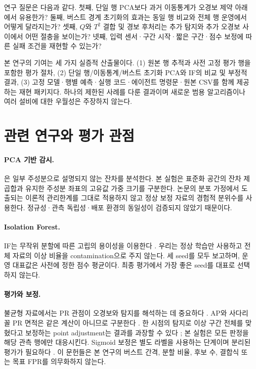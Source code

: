 \documentclass{article}
\begin{document}
연구 질문은 다음과 같다. 첫째, 단일 행 PCA보다 과거 이동통계가 오경보 제약 아래에서 유용한가? 둘째, 버스트 경계 초기화의 효과는 동일 행 비교와 전체 행 운영에서 어떻게 달라지는가? 셋째, $Q$와 $T^2$ 결합 및 경보 후처리는 추가 탐지와 추가 오경보 사이에서 어떤 절충을 보이는가? 넷째, 입력 센서·구간 시작·짧은 구간·점수 보정에 따른 실패 조건을 재현할 수 있는가?

본 연구의 기여는 세 가지 실증적 산출물이다. (1) 원본 행 추적과 사전 고정 평가 행을 포함한 평가 절차, (2) 단일 행/이동통계/버스트 초기화 PCA와 IF의 비교 및 부정적 결과, (3) 고정 모델·행별 예측·실행 코드·에이전트 명령문·원본 CSV를 함께 제공하는 재현 패키지다. 하나의 제한된 사례를 다룬 결과이며 새로운 범용 알고리즘이나 여러 설비에 대한 우월성은 주장하지 않는다.

\section{관련 연구와 평가 관점}
\paragraph{PCA 기반 감시.}
\citet{jackson1979}은 일부 주성분으로 설명되지 않는 잔차를 분석한다. 본 실험은 표준화 공간의 잔차 제곱합과 유지한 주성분 좌표의 고유값 가중 크기를 구분한다. 논문의 분포 가정에서 도출되는 이론적 관리한계를 그대로 적용하지 않고 정상 보정 자료의 경험적 분위수를 사용한다. 정규성·관측 독립성·배포 환경의 동일성이 검증되지 않았기 때문이다.

\paragraph{Isolation Forest.}
IF는 무작위 분할에 따른 고립의 용이성을 이용한다 \citep{liu2008}. 우리는 정상 학습만 사용하고 전체 자료의 이상 비율을 contamination으로 주지 않는다. 세 seed를 모두 보고하며, 운영 대표값은 사전에 정한 점수 평균이다. 최종 평가에서 가장 좋은 seed를 대표로 선택하지 않는다.

\paragraph{평가와 보정.}
불균형 자료에서는 PR 관점이 오경보와 탐지를 해석하는 데 중요하다 \citep{saito2015}. AP와 사다리꼴 PR 면적은 같은 계산이 아니므로 구분한다 \citep{sklearnap}. 한 시점의 탐지로 이상 구간 전체를 맞혔다고 보정하는 point adjustment는 결과를 과장할 수 있다 \citep{kim2022}; 본 실험은 모든 판정을 해당 관측 행에만 대응시킨다. Sigmoid 보정은 별도 라벨을 사용하는 단계이며 분리된 평가가 필요하다 \citep{sklearncal}. 이 문헌들은 본 연구의 버스트 간격, 분할 비율, 후보 수, 결합식 또는 목표 FPR를 의무화하지 않는다.
\end{document}
